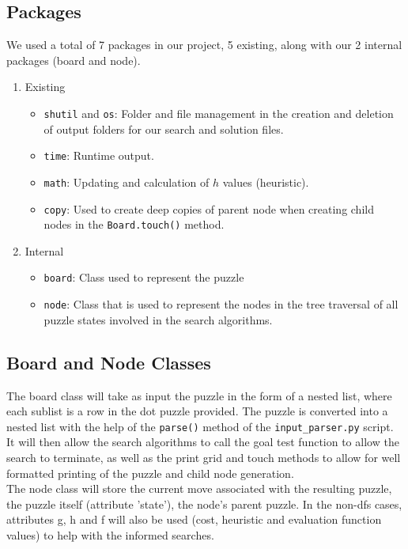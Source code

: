\documentclass[runningheads]{llncs}
\begin{document}
\subsection{Packages}

We used a total of 7 packages in our project, 5 existing, along with our 2 internal packages (board and node). 

\begin{enumerate}
    \item Existing 
    \begin{itemize}
        \item \verb|shutil| and \verb|os|: Folder and file management in the creation and deletion of output folders for our search and solution files. 
        \item \verb|time|: Runtime output. 
        \item \verb|math|: Updating and calculation of $h$ values (heuristic).
        \item \verb|copy|: Used to create deep copies of parent node when creating child nodes in the \verb|Board.touch()| method.
    \end{itemize}
    \item Internal
    \begin{itemize}
        \item \verb|board|: Class used to represent the puzzle 
        \item \verb|node|: Class that is used to represent the nodes in the tree traversal of all puzzle states involved in the search algorithms.
    \end{itemize}
\end{enumerate}

\subsection{Board and Node Classes}

The board class will take as input the puzzle in the form of a nested list, where each sublist is a row in the dot puzzle provided. The puzzle is converted into a nested list with the help of the \verb|parse()| method of the \verb|input_parser.py| script. It will then allow the search algorithms to call the goal test function to allow the search to terminate, as well as the print grid and touch methods to allow for well formatted printing of the puzzle and child node generation. \\

The node class will store the current move associated with the resulting puzzle, the puzzle itself (attribute 'state'), the node's parent puzzle. In the non-dfs cases, attributes g, h and f will also be used (cost, heuristic and evaluation function values) to help with the informed searches.
\end{document}
